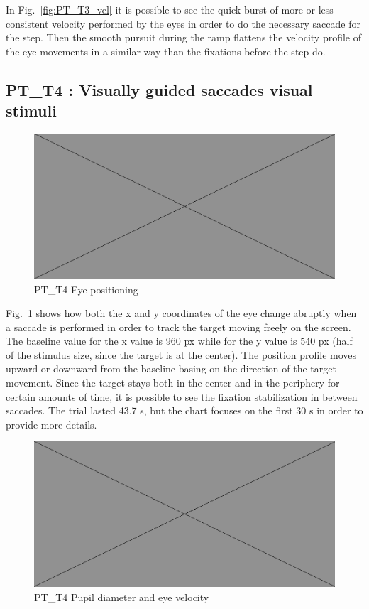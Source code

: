 In Fig.~\ref{fig:PT_T3_vel} it is possible to see the quick burst of more or less consistent velocity performed by the eyes in order to do the necessary saccade for the step. Then the smooth pursuit during the ramp flattens the velocity profile of the eye movements in a similar way than the fixations before the step do.


\subsection{PT\_T4 : Visually guided saccades visual stimuli}
\label{sec:PT_T4}

\begin{figure}[h]
  \centering
  \includegraphics[width=.5\textwidth]{figures/placeholderImg.jpg}
  \caption[PT\_T4 Eye positioning]{PT\_T4 Eye positioning}
  \label{fig:PT_T4_pos}
\end{figure}

Fig.~\ref{fig:PT_T4_pos} shows how both the x and y coordinates of the eye change abruptly when a saccade is performed in order to track the target moving freely on the screen. The baseline value for the x value is 960 px while for the y value is 540 px (half of the stimulus size, since the target is at the center). The position profile moves upward or downward from the baseline basing on the direction of the target movement. Since the target stays both in the center and in the periphery for certain amounts of time, it is possible to see the fixation stabilization in between saccades. The trial lasted 43.7 s, but the chart focuses on the first 30 s in order to provide more details.

\begin{figure}[h]
  \centering
  \includegraphics[width=.5\textwidth]{figures/placeholderImg.jpg}
  \caption[PT\_T4 pupil velocity]{PT\_T4 Pupil diameter and eye velocity}
  \label{fig:PT_T4_vel}
\end{figure}


